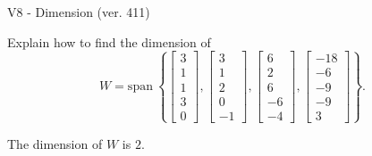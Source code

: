 \begin{exercise}
  \begin{exerciseTitle}V8 - Dimension (ver. 411)\end{exerciseTitle}
  \begin{exerciseStatement}
    Explain how to find the dimension of 
\[W=\mathrm{span}\ \left\{\left[\begin{array}{r}
3 \\
1 \\
1 \\
3 \\
0
\end{array}\right] , \left[\begin{array}{r}
3 \\
1 \\
2 \\
0 \\
-1
\end{array}\right] , \left[\begin{array}{r}
6 \\
2 \\
6 \\
-6 \\
-4
\end{array}\right] , \left[\begin{array}{r}
-18 \\
-6 \\
-9 \\
-9 \\
3
\end{array}\right]\right\}.\]



  \end{exerciseStatement}
  \begin{exerciseAnswer}
   The dimension of \(W\) is  \(2\).
  


  \end{exerciseAnswer}
\end{exercise}